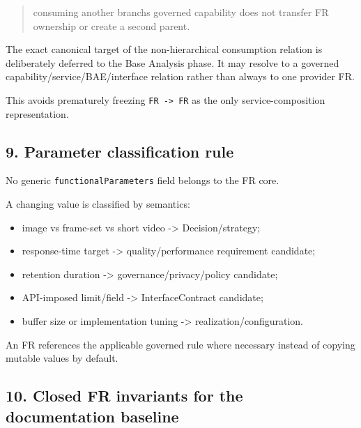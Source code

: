 \documentclass[
  10pt,
]{article}
\providecommand{\tightlist}{%
  \setlength{\itemsep}{0pt}\setlength{\parskip}{0pt}}
\begin{document}
\begin{quote}
consuming another branch\textquotesingle s governed capability does not
transfer FR ownership or create a second parent.
\end{quote}

The exact canonical target of the non-hierarchical consumption relation
is deliberately deferred to the Base Analysis phase. It may resolve to a
governed capability/service/BAE/interface relation rather than always to
one provider FR.

This avoids prematurely freezing \texttt{FR\ -\textgreater{}\ FR} as the
only service-composition representation.

\subsection{9. Parameter classification
rule}\label{9-parameter-classification-rule}

No generic \texttt{functionalParameters} field belongs to the FR core.

A changing value is classified by semantics:

\begin{itemize}
\tightlist
\item
  image vs frame-set vs short video -\textgreater{} Decision/strategy;
\item
  response-time target -\textgreater{} quality/performance requirement
  candidate;
\item
  retention duration -\textgreater{} governance/privacy/policy
  candidate;
\item
  API-imposed limit/field -\textgreater{} InterfaceContract candidate;
\item
  buffer size or implementation tuning -\textgreater{}
  realization/configuration.
\end{itemize}

An FR references the applicable governed rule where necessary instead of
copying mutable values by default.

\subsection{10. Closed FR invariants for the documentation
baseline}\label{10-closed-fr-invariants-for-the-documentation-baseline}
\end{document}
